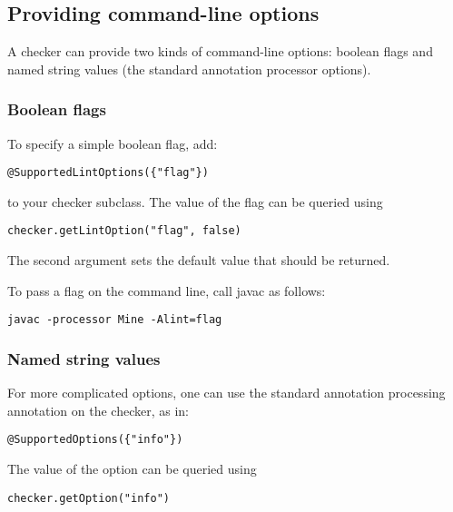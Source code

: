 \subsection{Providing command-line options\label{providing-command-line-options}}

A checker can provide two kinds of command-line options:
boolean flags and
named string values (the standard annotation processor
options).

\subsubsection{Boolean flags\label{providing-command-line-options-boolean-flags}}

To specify a simple boolean flag, add:

\begin{Verbatim}
@SupportedLintOptions({"flag"})
\end{Verbatim}

to your checker subclass.
The value of the flag can be queried using

\begin{Verbatim}
checker.getLintOption("flag", false)
\end{Verbatim}

The second argument sets the default value that should be returned.

To pass a flag on the command line, call javac as follows:

\begin{Verbatim}
javac -processor Mine -Alint=flag
\end{Verbatim}


\subsubsection{Named string values\label{providing-command-line-options-named-string-values}}

For more complicated options, one can use the standard annotation
processing  annotation on the checker, as in:

\begin{Verbatim}
@SupportedOptions({"info"})
\end{Verbatim}

The value of the option can be queried using

\begin{Verbatim}
checker.getOption("info")
\end{Verbatim}

